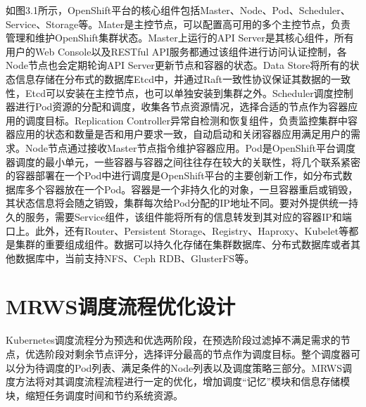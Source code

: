 如图3.1所示，OpenShift平台的核心组件包括Master、Node、Pod、Scheduler、Service、Storage等。Mater是主控节点，可以配置高可用的多个主控节点，负责管理和维护OpenShift集群状态。Master上运行的API Server是其核心组件，所有用户的Web Console以及RESTful API服务都通过该组件进行访问认证控制，各Node节点也会定期轮询API Server更新节点和容器的状态。Data Store将所有的状态信息存储在分布式的数据库Etcd中，并通过Raft一致性协议保证其数据的一致性，Etcd可以安装在主控节点，也可以单独安装到集群之外。Scheduler调度控制器进行Pod资源的分配和调度，收集各节点资源情况，选择合适的节点作为容器应用的调度目标。Replication Controller异常自检测和恢复组件，负责监控集群中容器应用的状态和数量是否和用户要求一致，自动启动和关闭容器应用满足用户的需求。Node节点通过接收Master节点指令维护容器应用。Pod是OpenShift平台调度器调度的最小单元，一些容器与容器之间往往存在较大的关联性，将几个联系紧密的容器部署在一个Pod中进行调度是OpenShift平台的主要创新工作，如分布式数据库多个容器放在一个Pod。容器是一个非持久化的对象，一旦容器重启或销毁，其状态信息将会随之销毁，集群每次给Pod分配的IP地址不同。要对外提供统一持久的服务，需要Service组件，该组件能将所有的信息转发到其对应的容器IP和端口上。此外，还有Router、Persistent Storage、Registry、Haproxy、Kubelet等都是集群的重要组成组件。数据可以持久化存储在集群数据库、分布式数据库或者其他数据库中，当前支持NFS、Ceph RDB、GlusterFS等。

\section{MRWS调度流程优化设计}
Kubernetes调度流程分为预选和优选两阶段，在预选阶段过滤掉不满足需求的节点，优选阶段对剩余节点评分，选择评分最高的节点作为调度目标。整个调度器可以分为待调度的Pod列表、满足条件的Node列表以及调度策略三部分。MRWS调度方法将对其调度流程流程进行一定的优化，增加调度“记忆”模块和信息存储模块，缩短任务调度时间和节约系统资源。

